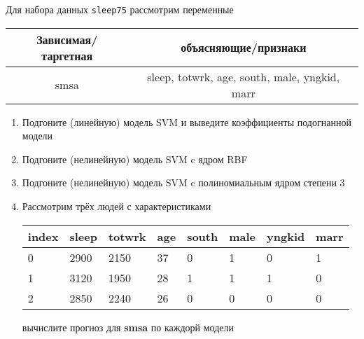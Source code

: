 \begin{exercise}
Для набора данных \texttt{sleep75} рассмотрим переменные

\begin{center}
	\begin{tabular}{|c|c|} \hline
		Зависимая/таргетная & объясняющие/признаки \\ \hline
		smsa & sleep, totwrk, age, south, male, yngkid, marr \\ \hline
	\end{tabular}
\end{center}

\begin{enumerate}
	\item Подгоните (линейную) модель SVM и выведите коэффициенты подогнанной модели
	\item Подгоните (нелинейную) модель SVM c ядром RBF
	\item Подгоните (нелинейную) модель SVM c полиномиальным ядром степени 3
	\item Рассмотрим трёх людей с характеристиками
	\begin{center}
		\begin{tabular}{|l||l|l|l|l|l|l|l|}\hline
			index & sleep & totwrk & age & south & male & yngkid & marr \\ \hline\hline
			0 & 2900 & 2150 & 37 & 0 & 1 &  0 & 1 \\
			1 & 3120 & 1950 & 28 & 1 & 1 &  1 & 0 \\
			2 & 2850 & 2240 & 26 & 0 & 0 &  0 & 0 \\ \hline
		\end{tabular}
	\end{center}
	вычислите прогноз для \textbf{smsa} по каждорй модели
\end{enumerate}
\end{exercise}

